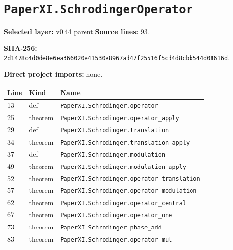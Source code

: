 \documentclass[10pt,oneside]{book}
\begin{document}
\section{\texorpdfstring{\nolinkurl{PaperXI.SchrodingerOperator}}{PaperXI.SchrodingerOperator}}\label{module:PaperXI.SchrodingerOperator}

\textbf{Selected layer:} v0.44 parent.\quad\textbf{Source lines:} 93.\par\textbf{SHA-256:} {\scriptsize\nolinkurl{2d1478c4d0de8e6ea366020e41530e8967ad47f25516f5cd4d8cbb544d08616d}}.


\textbf{Direct project imports:} none.

\begin{longtable}{@{}p{}p{}p{}@{}}\toprule Line&Kind&Name\\\midrule\endhead

13&def&\nolinkurl{PaperXI.Schrodinger.operator}\\

25&theorem&\nolinkurl{PaperXI.Schrodinger.operator_apply}\\

29&def&\nolinkurl{PaperXI.Schrodinger.translation}\\

34&theorem&\nolinkurl{PaperXI.Schrodinger.translation_apply}\\

37&def&\nolinkurl{PaperXI.Schrodinger.modulation}\\

49&theorem&\nolinkurl{PaperXI.Schrodinger.modulation_apply}\\

52&theorem&\nolinkurl{PaperXI.Schrodinger.operator_translation}\\

57&theorem&\nolinkurl{PaperXI.Schrodinger.operator_modulation}\\

62&theorem&\nolinkurl{PaperXI.Schrodinger.operator_central}\\

67&theorem&\nolinkurl{PaperXI.Schrodinger.operator_one}\\

73&theorem&\nolinkurl{PaperXI.Schrodinger.phase_add}\\

83&theorem&\nolinkurl{PaperXI.Schrodinger.operator_mul}\\

\bottomrule\end{longtable}
\end{document}
